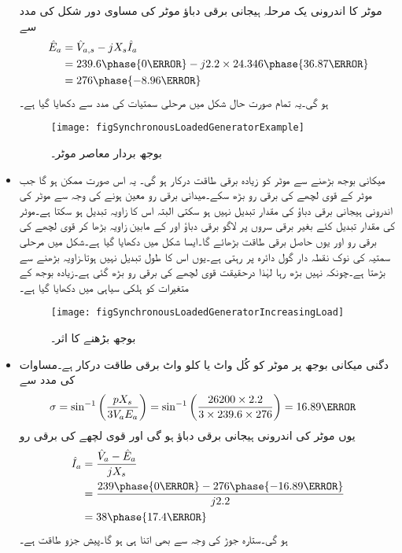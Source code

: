 \begin{itemize}
موٹر کا اندرونی یک مرحلہ ہیجانی برقی دباؤ موٹر کی مساوی دور شکل   کی مدد سے
\begin{align*}
\hat{E}_a&=\hat{V}_{a,s}- j X_s \hat{I}_a\\
&=239.6 \phase{0\degree}-j 2.2 \times 24.346 \phase{36.87\degree}\\
&=276 \phase{-8.96\degree}
\end{align*}
ہو گی۔یہ تمام صورت حال شکل   میں مرحلی سمتیات کی مدد سے دکھایا گیا ہے۔
\begin{figure}
\centering
\texttt{[image: figSynchronousLoadedGeneratorExample]}
\caption{بوجھ بردار معاصر موٹر۔}
\label{شکل_معاصر_بار_بردار_جنریٹر_مثال}
\end{figure}
%
\item
میکانی بوجھ بڑھنے سے موٹر کو زیادہ برقی طاقت درکار ہو گی۔ یہ اس صورت ممکن ہو گا جب موٹر کے قوی لچھے کی برقی رو بڑھ سکے۔میدانی برقی رو معین ہونے کی وجہ سے موٹر کی اندرونی ہیجانی برقی دباؤ  کی مقدار تبدیل نہیں ہو سکتی البتہ اس کا زاویہ تبدیل ہو سکتا ہے۔موٹر    کی مقدار تبدیل کئے بغیر  برقی سروں پر لاگو برقی دباؤ    اور   کے مابین زاویہ بڑھا کر قوی لچھے کی برقی رو اور یوں حاصل برقی طاقت بڑھائے گا۔ایسا شکل   میں دکھایا گیا ہے۔شکل میں  مرحلی سمتیہ کی نوک نقطہ دار گول دائرہ پر رہتی ہے۔یوں اس کا طول تبدیل نہیں ہوتا۔زاویہ بڑھنے سے  بڑھتا ہے۔چونکہ  نہیں بڑھ رہا لہٰذا درحقیقت قوی لچھے کی برقی رو بڑھ گئی ہے۔زیادہ بوجھ کے متغیرات کو ہلکی سیاہی میں دکھایا گیا ہے۔
\begin{figure}
\centering
\texttt{[image: figSynchronousLoadedGeneratorIncreasingLoad]}
\caption{بوجھ بڑھنے کا اثر۔}
\label{شکل_معاصر_بار_بڑھانے_کا_اثر}
\end{figure}
%
\item
دگنی میکانی بوجھ پر موٹر کو کُل   واٹ یا   کلو واٹ برقی طاقت درکار ہے۔مساوات   کی مدد سے
\begin{align*}
\sigma&=\sin^{-1} \left(\frac{p X_s}{3 V_a E_a} \right)=\sin^{-1} \left(\frac{26200 \times 2.2}{3\times 239.6 \times 276} \right)=16.89\degree
\end{align*}
یوں موٹر کی اندرونی ہیجانی برقی دباؤ  ہو گی اور قوی لچھے کی برقی رو
\begin{align*}
\hat{I}_a&=\frac{\hat{V}_a-\hat{E}_a}{j X_s}\\
&=\frac{239\phase{0\degree}-276\phase{-16.89\degree}}{j 2.2}\\
&=38\phase{17.4\degree}
\end{align*}
ہو گی۔ستارہ جوڑ کی وجہ سے  بھی اتنا ہی ہو گا۔پیش جزو طاقت  ہے۔
\end{itemize}
